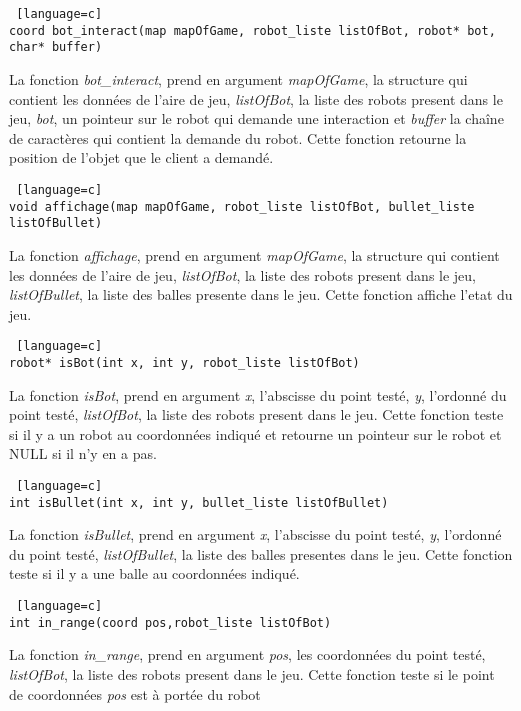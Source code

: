 \documentclass[a4paper, 11pt]{article}
\begin{document}
\begin {lstlisting} [language=c]
coord bot_interact(map mapOfGame, robot_liste listOfBot, robot* bot, char* buffer)
\end{lstlisting}
La fonction \emph{bot\_interact}, prend en argument \emph{mapOfGame}, la structure qui contient les données de l'aire de jeu, \emph{listOfBot}, la liste des robots present dans le jeu, \emph{bot}, un pointeur sur le robot qui demande une interaction et \emph{buffer} la chaîne de caractères qui contient la demande du robot. Cette fonction retourne la position de l'objet que le client a demandé.\\

\begin {lstlisting} [language=c]
void affichage(map mapOfGame, robot_liste listOfBot, bullet_liste listOfBullet)
\end{lstlisting}
La fonction \emph{affichage}, prend en argument \emph{mapOfGame}, la structure qui contient les données de l'aire de jeu, \emph{listOfBot}, la liste des robots present dans le jeu, \emph{listOfBullet}, la liste des balles presente dans le jeu. Cette fonction affiche l'etat du jeu.\\

\begin {lstlisting} [language=c]
robot* isBot(int x, int y, robot_liste listOfBot)
\end{lstlisting}
La fonction \emph{isBot}, prend en argument \emph{x}, l'abscisse du point testé, \emph{y}, l'ordonné du point testé, \emph{listOfBot}, la liste des robots present dans le jeu. Cette fonction teste si il y a un robot au coordonnées indiqué et retourne un pointeur sur le robot et NULL si il n'y en a pas.\\

\begin {lstlisting} [language=c]
int isBullet(int x, int y, bullet_liste listOfBullet)
\end{lstlisting}
La fonction \emph{isBullet}, prend en argument \emph{x}, l'abscisse du point testé, \emph{y}, l'ordonné du point testé, \emph{listOfBullet}, la liste des balles presentes dans le jeu. Cette fonction teste si il y a une balle au coordonnées indiqué.\\

\begin {lstlisting} [language=c]
int in_range(coord pos,robot_liste listOfBot)
\end{lstlisting}
La fonction \emph{in\_range}, prend en argument \emph{pos}, les coordonnées du point testé, \emph{listOfBot}, la liste des robots present dans le jeu. Cette fonction teste si le point de coordonnées \emph{pos} est à portée du robot\\
\end{document}
